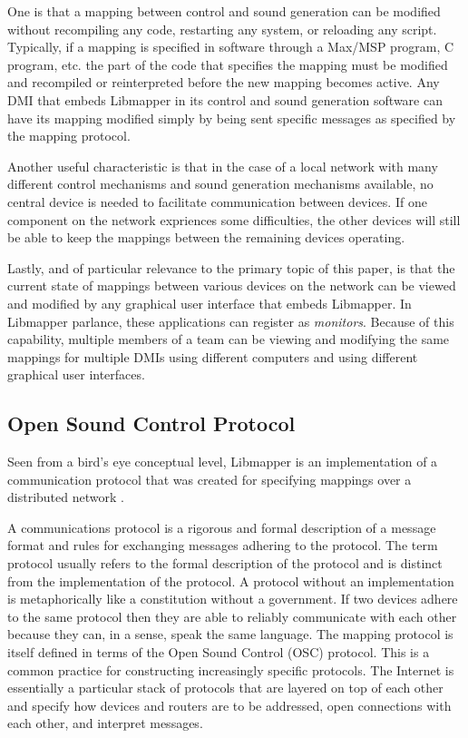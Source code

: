 One is that a mapping between control and sound generation can be modified without recompiling any code, restarting any system, or reloading any script. Typically, if a mapping is specified in software through a Max/MSP program, C program, etc. the part of the code that specifies the mapping must be modified and recompiled or reinterpreted before the new mapping becomes active. Any DMI that embeds Libmapper in its control and sound generation software can have its mapping modified simply by being sent specific messages as specified by the mapping protocol. 

Another useful characteristic is that in the case of a local network with many different control mechanisms and sound generation mechanisms available, no central device is needed to facilitate communication between devices. If one component on the network expriences some difficulties, the other devices will still be able to keep the mappings between the remaining devices operating.  

Lastly, and of particular relevance to the primary topic of this paper, is that the current state of mappings between various devices on the network can be viewed and modified by any graphical user interface that embeds Libmapper. In Libmapper parlance, these applications can register as \emph{monitors}. Because of this capability, multiple members of a team can be viewing and modifying the same mappings for multiple DMIs using different computers and using different graphical user interfaces.  

\subsection{Open Sound Control Protocol}

Seen from a bird's eye conceptual level, Libmapper is an implementation of a communication protocol that was created for specifying mappings over a distributed network \cite{Malloch2009}. 

A communications protocol is a rigorous and formal description of a message format and rules for exchanging messages adhering to the protocol. The term protocol usually refers to the formal description of the protocol and is distinct from the implementation of the protocol. A protocol without an implementation is metaphorically like a constitution without a government. If two devices adhere to the same protocol then they are able to reliably communicate with each other because they can, in a sense, speak the same language. The mapping protocol is itself defined in terms of the Open Sound Control (OSC) protocol. This is a common practice for constructing increasingly specific protocols. The Internet is essentially a particular stack of protocols that are layered on top of each other and specify how devices and routers are to be addressed, open connections with each other, and interpret messages.

